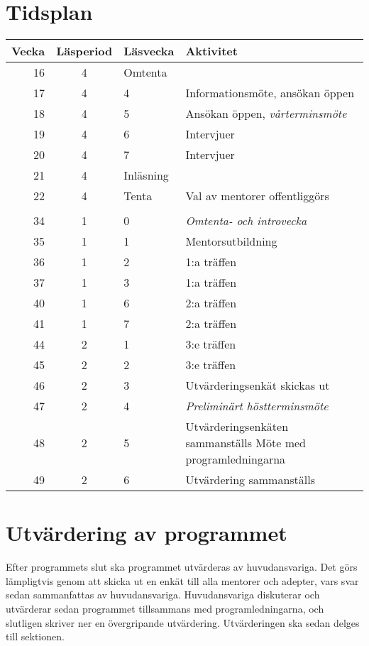 \documentclass[10pt]{article}
\begin{document}
    \section{Tidsplan}
    \begin{tabularx}{\textwidth}{rclX}
        \textbf{Vecka} & \textbf{Läsperiod} & \textbf{Läsvecka} & \textbf{Aktivitet} \\
        \hline
        16 & 4 & Omtenta & \\
        17 & 4 & 4 & Informationsmöte, ansökan öppen \\
        18 & 4 & 5 & Ansökan öppen, \emph{vårterminsmöte} \\
        19 & 4 & 6 & Intervjuer \\
        20 & 4 & 7 & Intervjuer \\
        21 & 4 & Inläsning & \\
        22 & 4 & Tenta & Val av mentorer offentliggörs \\
        \\
        34 & 1 & 0 & \emph{Omtenta- och introvecka} \\
        35 & 1 & 1 & Mentorsutbildning \\
        36 & 1 & 2 & 1:a träffen \\
        37 & 1 & 3 & 1:a träffen \\
        40 & 1 & 6 & 2:a träffen \\
        41 & 1 & 7 & 2:a träffen \\
        44 & 2 & 1 & 3:e träffen \\
        45 & 2 & 2 & 3:e träffen \\
        46 & 2 & 3 & Utvärderingsenkät skickas ut \\
        47 & 2 & 4 & \emph{Preliminärt höstterminsmöte} \\
        48 & 2 & 5 & Utvärderingsenkäten sammanställs \newline
                     Möte med programledningarna \\
        49 & 2 & 6 & Utvärdering sammanställs \\
    \end{tabularx}

    \newpage

    \section{Utvärdering av programmet}
    Efter programmets slut ska programmet utvärderas av huvudansvariga.
    Det görs lämpligtvis genom att skicka ut en enkät till alla mentorer och adepter, vars svar sedan sammanfattas av huvudansvariga.
    Huvudansvariga diskuterar och utvärderar sedan programmet tillsammans med programledningarna, och slutligen skriver ner en övergripande utvärdering.
    Utvärderingen ska sedan delges till sektionen.
\end{document}

